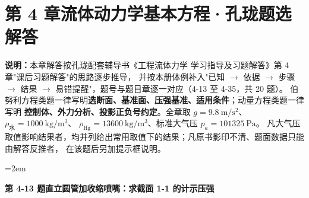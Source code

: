 \chapter*{第 4 章\quad 流体动力学基本方程·孔珑题选 解答}

\begin{tishi}
\textbf{说明：}本章解答按孔珑配套辅导书《工程流体力学 学习指导及习题解答》第 4 章"课后习题解答"的思路逐步推导，
并按本册体例补入"已知 $\to$ 依据 $\to$ 步骤 $\to$ 结果 $\to$ 易错提醒"，题号与题目章逐一对应（4-13 至 4-35，共 20 题）。
伯努利方程类题一律写明\textbf{选断面、基准面、压强基准、适用条件}；动量方程类题一律写明
\textbf{控制体、外力分析、投影正负号约定}。全章取 $g=9.8\ \mathrm{m/s^2}$、$\rho_{\text{水}}=1000\ \mathrm{kg/m^3}$、
$\rho_{\text{Hg}}=13600\ \mathrm{kg/m^3}$、标准大气压 $p_a=101325\ \mathrm{Pa}$。
凡大气压取值影响结果者，均并列给出常用取值下的结果；凡原书影印不清、题面数据只能由解答反推者，
在该题后另加提示框说明。
\end{tishi}

\sloppy
\emergencystretch=2em

\noindent\textbf{第 4-13 题\quad 直立圆管加收缩喷嘴：求截面 1-1 的计示压强}

